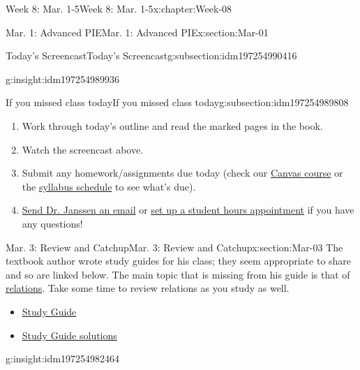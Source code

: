 \documentclass[oneside,10pt,]{book}
\numberwithin{equation}{section}
\newlength{\qrsize}
\newlength{\previewwidth}
\begin{document}
\begin{chapterptx}{Week 8: Mar. 1-5}{}{Week 8: Mar. 1-5}{}{}{x:chapter:Week-08}
\begin{sectionptx}{Mar. 1: Advanced PIE}{}{Mar. 1: Advanced PIE}{}{}{x:section:Mar-01}
\begin{subsectionptx}{Today's Screencast}{}{Today's Screencast}{}{}{g:subsection:idm197254990416}
\begin{insight}{}{g:insight:idm197254989936}%
\end{insight}
\end{subsectionptx}
%
%
\typeout{************************************************}
\typeout{************************************************}
%
\begin{subsectionptx}{If you missed class today}{}{If you missed class today}{}{}{g:subsection:idm197254989808}
%
\begin{enumerate}
\item{}Work through today's outline and read the marked pages in the book.%
\item{}Watch the screencast above.%
\item{}Submit any homework\slash{}assignments due today (check our \href{https://dordt.instructure.com/courses/3110050}{Canvas course} or the \href{https://prof.mkjanssen.org/ds/index.html\#schedule}{syllabus schedule} to see what's due).%
\item{}\href{mailto:mike.janssen@dordt.edu}{Send Dr. Janssen an email} or \href{https://calendly.com/mkjanssen/student-hours}{set up a student hours appointment} if you have any questions!%
\end{enumerate}
\end{subsectionptx}
\end{sectionptx}
%
%
\typeout{************************************************}
\typeout{************************************************}
%
\begin{sectionptx}{Mar. 3: Review and Catchup}{}{Mar. 3: Review and Catchup}{}{}{x:section:Mar-03}
The textbook author wrote study guides for his class; they seem appropriate to share and so are linked below. The main topic that is missing from his guide is that of \href{https://prof.mkjanssen.org/ds/notes/Jan-29.html}{relations}. Take some time to review relations as you study as well.%
%
\begin{itemize}[label=\textbullet]
\item{}\href{./Exam1Guide.pdf}{Study Guide}%
\item{}\href{./Exam1Guide-solutions.pdf}{Study Guide solutions}%
\end{itemize}
\begin{insight}{}{g:insight:idm197254982464}%
\setlength{\qrsize}{9em}
\setlength{\previewwidth}{\linewidth}
\addtolength{\previewwidth}{-\qrsize}
\begin{tcbraster}[raster columns=2, raster column skip=1pt, raster halign=center, raster force size=false, raster left skip=0pt, raster right skip=0pt]%

\end{tcbraster}
\end{insight}
\end{sectionptx}
\end{chapterptx}
\end{document}
